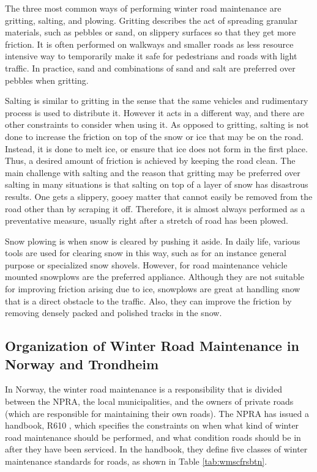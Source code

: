 The three most common ways of performing winter road maintenance are gritting, salting, and plowing. Gritting describes the act of spreading granular materials, such as pebbles or sand, on slippery surfaces so that they get more friction. It is often performed on walkways and smaller roads as less resource intensive way to temporarily make it safe for pedestrians and roads with light traffic. In practice, sand and combinations of sand and salt are preferred over pebbles when gritting.

Salting is similar to gritting in the sense that the same vehicles and rudimentary process is used to distribute it. However it acts in a different way, and there are other constraints to consider when using it. As opposed to gritting, salting is not done to increase the friction on top of the snow or ice that may be on the road. Instead, it is done to melt ice, or ensure that ice does not form in the first place. Thus, a desired amount of friction is achieved by keeping the road clean. The main challenge with salting and the reason that gritting may be preferred over salting in many situations is that salting on top of a layer of snow has disastrous results. One gets a slippery, gooey matter that cannot easily be removed from the road other than by scraping it off. Therefore, it is almost always performed as a preventative measure, usually right after a stretch of road has been plowed.

Snow plowing is when snow is cleared by pushing it aside. In daily life, various tools are used for clearing snow in this way, such as for an instance general purpose or specialized snow shovels. However, for road maintenance vehicle mounted snowplows are the preferred appliance. Although they are not suitable for improving friction arising due to ice, snowplows are great at handling snow that is a direct obstacle to the traffic. Also, they can improve the friction by removing densely packed and polished tracks in the snow.

\subsection{Organization of Winter Road Maintenance in Norway and Trondheim} %
\label{ssub:how_winter_road_maintenance_is_organized_in_norway_and_trondheim}


In Norway, the winter road maintenance is a responsibility that is divided between the NPRA, the local municipalities, and the owners of private roads (which are responsible for maintaining their own roads). The NPRA has issued a handbook, R610 \citep{svvR610}, which specifies the constraints on when what kind of winter road maintenance should be performed, and what condition roads should be in after they have been serviced. In the handbook, they define five classes of winter maintenance standards for roads, as shown in Table \ref{tab:wmscfrsbtn}.

